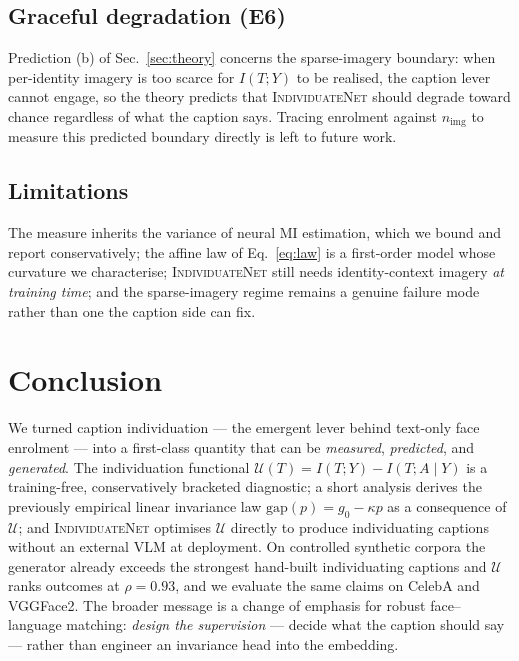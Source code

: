 \documentclass[10pt,twocolumn,letterpaper]{article}
\newcommand{\U}{\mathcal{U}}
\newcommand{\method}{\textsc{IndividuateNet}}
\begin{document}
\subsection{Graceful degradation (E6)}
\label{sec:e6}
Prediction (b) of Sec.~\ref{sec:theory} concerns the sparse-imagery boundary: when per-identity
imagery is too scarce for $I(T;Y)$ to be realised, the caption lever cannot engage, so the theory
predicts that \method{} should degrade toward chance regardless of what the caption says. Tracing
enrolment against $n_{\text{img}}$ to measure this predicted boundary directly is left to future work.

\subsection{Limitations}
\label{sec:limits}
The measure inherits the variance of neural MI estimation, which we bound and report
conservatively; the affine law of Eq.~\ref{eq:law} is a first-order model whose curvature we
characterise; \method{} still needs identity-context imagery \emph{at training time}; and the
sparse-imagery regime remains a genuine failure mode rather than one the caption side can fix.

\section{Conclusion}
\label{sec:conclusion}
We turned caption individuation --- the emergent lever behind text-only face enrolment --- into
a first-class quantity that can be \emph{measured}, \emph{predicted}, and \emph{generated}. The
individuation functional $\U(T)=I(T;Y)-I(T;A\mid Y)$ is a training-free, conservatively bracketed
diagnostic; a short analysis derives the previously empirical linear invariance law
$\mathrm{gap}(p)=g_0-\kappa p$ as a consequence of $\U$; and \method{} optimises $\U$ directly to
produce individuating captions without an external VLM at deployment. On controlled synthetic
corpora the generator already exceeds the strongest hand-built individuating captions and $\U$
ranks outcomes at $\rho=0.93$, and we evaluate the same claims on CelebA and VGGFace2. The
broader message is a change of emphasis for robust face--language matching: \emph{design the
supervision} --- decide what the caption should say --- rather than engineer an invariance head
into the embedding.

\end{document}
